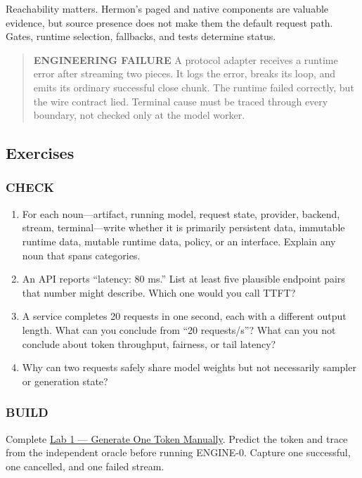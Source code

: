 \documentclass[
  10pt,
]{article}
\providecommand{\tightlist}{%
  \setlength{\itemsep}{0pt}\setlength{\parskip}{0pt}}
\begin{document}
Reachability matters. Hermon's paged and native components are valuable
evidence, but source presence does not make them the default request
path. Gates, runtime selection, fallbacks, and tests determine status.

\begin{quote}
\textbf{ENGINEERING FAILURE} A protocol adapter receives a runtime error
after streaming two pieces. It logs the error, breaks its loop, and
emits its ordinary successful close chunk. The runtime failed correctly,
but the wire contract lied. Terminal cause must be traced through every
boundary, not checked only at the model worker.
\end{quote}

\subsection{Exercises}\label{exercises}

\subsubsection{CHECK}\label{check}

\begin{enumerate}
\def\labelenumi{\arabic{enumi}.}
\tightlist
\item
  For each noun---artifact, running model, request state, provider,
  backend, stream, terminal---write whether it is primarily persistent
  data, immutable runtime data, mutable runtime data, policy, or an
  interface. Explain any noun that spans categories.
\item
  An API reports ``latency: 80 ms.'' List at least five plausible
  endpoint pairs that number might describe. Which one would you call
  TTFT?
\item
  A service completes 20 requests in one second, each with a different
  output length. What can you conclude from ``20 requests/s''? What can
  you not conclude about token throughput, fairness, or tail latency?
\item
  Why can two requests safely share model weights but not necessarily
  sampler or generation state?
\end{enumerate}

\subsubsection{BUILD}\label{build}

Complete
\href{https://github.com/hermonai/inside-the-llm-engine/blob/astra-visual-rewrite/labs/lab-01-generate-one-token-manually.md}{Lab
1 --- Generate One Token Manually}. Predict the token and trace from the
independent oracle before running ENGINE-0. Capture one successful, one
cancelled, and one failed stream.
\end{document}
